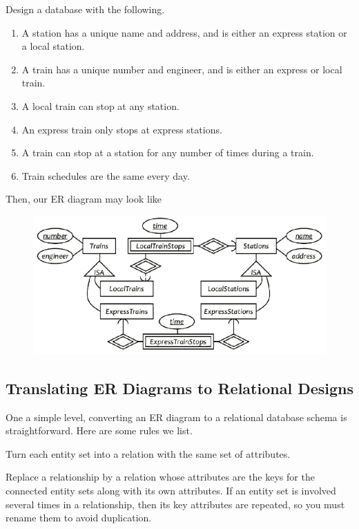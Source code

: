   \begin{example}
    Design a database with the following. 
    \begin{enumerate}
      \item A station has a unique name and address, and is either an express station or a local station. 
      \item A train has a unique number and engineer, and is either an express or local train. 
      \item A local train can stop at any station. 
      \item An express train only stops at express stations. 
      \item A train can stop at a station for any number of times during a train. 
      \item Train schedules are the same every day. 
    \end{enumerate}
    Then, our ER diagram may look like 
    \begin{figure}[H]
      \centering 
      \includegraphics[scale=0.4]{img/train1.png}
      \caption{} 
      \label{fig:train1}
    \end{figure}
  \end{example}

\subsection{Translating ER Diagrams to Relational Designs}

  One a simple level, converting an ER diagram to a relational database schema is straightforward. Here are some rules we list. 

  \begin{theorem}
    Turn each entity set into a relation with the same set of attributes. 
  \end{theorem}

  \begin{theorem}
    Replace a relationship by a relation whose attributes are the keys for the connected entity sets along with its own attributes. If an entity set is involved several times in a relationship, then its key attributes are repeated, so you must rename them to avoid duplication.
  \end{theorem}

